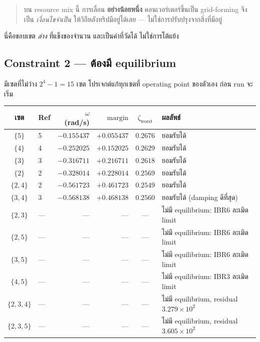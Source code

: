 \documentclass[12pt,a4paper]{article}
\theoremstyle{remark}
\newcommand{\zworst}{\zeta_{\mathrm{worst}}}
\begin{document}
\begin{quote}
บน resource mix นี้ การเลื่อน \textbf{อย่างน้อยหนึ่ง} คอนเวอร์เตอร์ขึ้นเป็น
grid-forming จึงเป็น \emph{เงื่อนไขจำเป็น} ให้วิถีหลังทริปมีอยู่ได้เลย ---
ไม่ใช่การปรับปรุงจากสิ่งที่มีอยู่
\end{quote}

นี่คือขอบเขต \emph{ล่าง} ที่แข็งของจำนวน และเป็นค่าที่วัดได้ ไม่ใช่การโต้แย้ง

\subsection{Constraint 2 --- ต้องมี equilibrium}

มีเซตที่ไม่ว่าง $2^4-1 = 15$ เซต โปรเจกต์แก้ทุกเซตที่ operating point ของตัวเอง
ก่อน run จะเริ่ม

\begin{table}[H]
\centering
\small
\begin{tabular}{@{}clrrcl@{}}
\toprule
\textbf{เซต} & \textbf{Ref} & $\omega$ (rad/s) & $\mathrm{margin}$ & $\zworst$ & \textbf{ผลลัพธ์}\\
\midrule
$\{5\}$        & 5 & $-0.155437$ & $+0.055437$ & $0.2676$ & ยอมรับได้\\
$\{4\}$        & 4 & $-0.252025$ & $+0.152025$ & $0.2629$ & ยอมรับได้\\
$\{3\}$        & 3 & $-0.316711$ & $+0.216711$ & $0.2618$ & ยอมรับได้\\
$\{2\}$        & 2 & $-0.328014$ & $+0.228014$ & $0.2569$ & ยอมรับได้\\
$\{2,4\}$      & 2 & $-0.561723$ & $+0.461723$ & $0.2549$ & ยอมรับได้\\
$\{3,4\}$      & 3 & $\mathbf{-0.568138}$ & $\mathbf{+0.468138}$ & $0.2560$ & ยอมรับได้ (damping ดีที่สุด)\\
\midrule
$\{2,3\}$      & --- & --- & --- & --- & ไม่มี equilibrium: IBR6 ละเมิด limit\\
$\{2,5\}$      & --- & --- & --- & --- & ไม่มี equilibrium: IBR6 ละเมิด limit\\
$\{3,5\}$      & --- & --- & --- & --- & ไม่มี equilibrium: IBR6 ละเมิด limit\\
$\{4,5\}$      & --- & --- & --- & --- & ไม่มี equilibrium: IBR3 ละเมิด limit\\
\midrule
$\{2,3,4\}$    & --- & --- & --- & --- & ไม่มี equilibrium, residual $3.279\times10^{2}$\\
$\{2,3,5\}$    & --- & --- & --- & --- & ไม่มี equilibrium, residual $3.605\times10^{2}$\\

\end{tabular}
\end{table}
\end{document}
